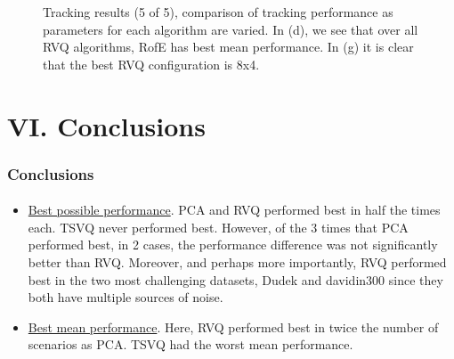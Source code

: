 \begin{frame}
\begin{figure}[h!]
\caption{Tracking results (5 of 5), comparison of tracking performance as parameters for each algorithm are varied.  In (d), we see that over all RVQ algorithms, RofE has best mean performance.  In (g) it is clear that the best RVQ configuration is 8x4.}
\label{fig:results_final_5_configs}
\end{figure}
\end{frame}

\section{VI. Conclusions}
\begin{frame}
\frametitle{Conclusions}
\framesubtitle{}
\mypagenum
\begin{itemize}
\item \underline{Best possible performance}.  PCA and RVQ performed best in half the times each.  TSVQ never performed best.  However, of the 3 times that PCA performed best, in 2 cases, the performance difference was not significantly better than RVQ.  Moreover, and perhaps more importantly, RVQ performed best in the two most challenging datasets, Dudek and davidin300 since they both have multiple sources of noise.
\item \underline{Best mean performance}.  Here, RVQ performed best in twice the number of scenarios as PCA.  TSVQ had the worst mean performance.
\end{itemize}
\end{frame}

